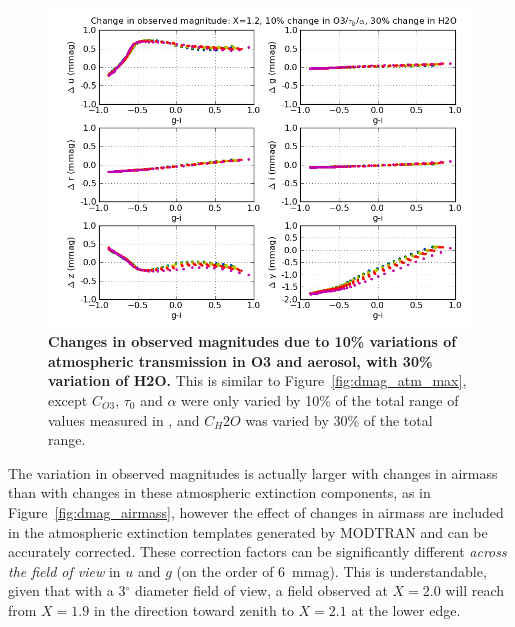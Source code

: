 \documentclass[12pt,preprint]{aastex}
\begin{document}
\begin{figure}
\centering
\includegraphics[width=6in]{delta_mags_10}
\caption{{\small
{\bf Changes in observed magnitudes due to 10\% variations of 
atmospheric transmission in O3 and aerosol, with 30\% variation of H2O.} 
This is similar to Figure~\ref{fig:dmag_atm_max}, except $C_{O3}$,
$\tau_0$ and $\alpha$ were only varied by 10\% of the total range of
values measured in \citet{Burke2010b}, and $C_H2O$ was varied by 30\%
of the total range. }}
\label{fig:dmag_atm_10}
\end{figure}

The variation in observed magnitudes is actually larger with changes
in airmass than with changes in these atmospheric extinction
components, as in Figure~\ref{fig:dmag_airmass}, however the effect of
changes in airmass are included in the atmospheric extinction
templates generated by MODTRAN and can be accurately corrected.  These
correction factors can be significantly different {\it across the
field of view} in $u$ and $g$ (on the order of 6~mmag). This is
understandable, given that with a 3$^{\circ}$ diameter field of view,
a field observed at $X=2.0$ will reach from $X=1.9$ in the direction
toward zenith to $X=2.1$ at the lower edge. 
\end{document}
